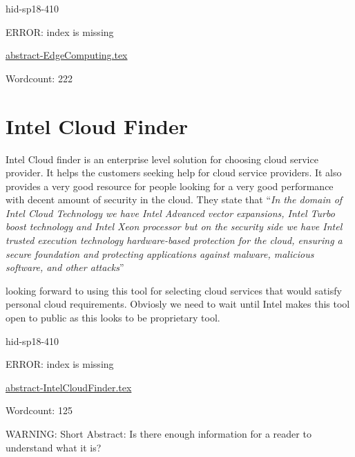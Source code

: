 \begin{IU}

hid-sp18-410

ERROR: index is missing

\href{https://github.com/cloudmesh-community/hid-sp18-410/blob/master//technology/abstract-EdgeComputing.tex}{abstract-EdgeComputing.tex}

 

Wordcount: 222

\end{IU}

\section{Intel Cloud Finder}



Intel Cloud finder is an enterprise level solution for choosing cloud
service provider. It helps the customers seeking help for cloud
service providers. It also provides a very good resource for people
looking for a very good performance with decent amount of security in
the cloud. They state that \color{blue}``\emph{In the domain of Intel Cloud Technology
we have Intel Advanced vector expansions, Intel Turbo boost technology
and Intel Xeon processor but on the security side we have Intel
trusted execution technology hardware-based protection for the cloud,
ensuring a secure foundation and protecting applications against
malware, malicious software, and other attacks}''\color{black}~\cite{hid-sp18-410-Intel}

looking forward to using this tool for selecting cloud
services that would satisfy personal cloud requirements. Obviosly we need to
wait until Intel makes this tool open to public as this looks to be
proprietary tool.


\begin{IU}

hid-sp18-410

ERROR: index is missing

\href{https://github.com/cloudmesh-community/hid-sp18-410/blob/master//technology/abstract-IntelCloudFinder.tex}{abstract-IntelCloudFinder.tex}

 

Wordcount: 125

WARNING: Short Abstract: Is there enough information for a reader to understand what it is?

\end{IU}

